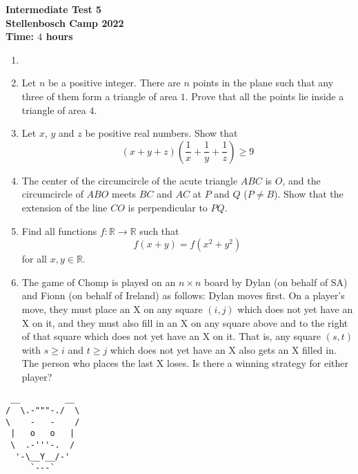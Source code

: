 \documentclass{article}
\begin{document}
\thispagestyle{empty}

\begin{center}
  \textbf{\Large Intermediate Test 5}
  \\ \vspace{1em}
  \textbf{\large Stellenbosch Camp 2022}
  \\ \vspace{1em}
  \textbf{\large Time: $4$ hours}
\end{center}

\bigskip

\begin{enumerate}[itemsep=\fill]

\item %

 
\item %

Let $n$ be a positive integer. There are $n$ points in the plane such that any three of them form a triangle of area $1$. Prove that all the points lie inside a triangle of area $4$. 

\item %

Let $x$, $y$ and $z$ be positive real numbers. Show that 
$$(x+y+z)\left(\frac{1}{x}+\frac{1}{y}+\frac{1}{z}\right) \geq 9$$


\item %

The center of the circumcircle of the acute triangle $ABC$ is $O$, and the circumcircle of $ABO$ meets $BC$ and $AC$ at $P$ and $Q$ ($P\neq B$).
Show that the extension of the line $CO$ is perpendicular to $PQ$.


\item %
Find all functions $f : \mathbb{R} \to \mathbb{R}$ such that \[ f(x+y) = f(x^2+y^2) \] for all $x,y \in \mathbb{R}$.


\item %
The game of Chomp is played on an $n \times n$ board by Dylan (on behalf of SA) and Fionn (on behalf of Ireland) as follows: Dylan moves first.
On a player's move, they must place an X on any square $(i, j)$ which does not yet have an X on it, and they must also fill in an X on any square above and to the right of that square which does not yet have an X on it.
That is, any square $(s, t)$ with $s \geq i$ and $t \geq j$ which does not yet have an X also gets an X filled in.
The person who places the last X loses.
Is there a winning strategy for either player?

\end{enumerate}


\vfill
\centering
\small
\begin{BVerbatim}
 __         __
/  \.-"""-./  \
\    -   -    /
 |   o   o   |
 \  .-'''-.  /
  '-\__Y__/-'
     `---`
\end{BVerbatim}
\end{document}
